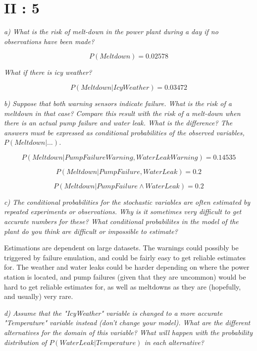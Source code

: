 \section{II : 5}
\begin{framed}\em a) What is the risk of melt-down in the power plant during a day if no observations have been made? \em\end{framed}

$$P(Meltdown) = 0.02578$$

\begin{framed}\em What if there is icy weather?\em\end{framed}

$$P(Meltdown|IcyWeather) = 0.03472$$

\begin{framed}\em b) Suppose that both warning sensors indicate failure. What is the risk of a meltdown in that case? Compare this result with the risk of a melt-down when there is an actual pump failure and water leak. What is the difference? The answers must be expressed as conditional probabilities of the observed variables, $P(Meltdown|...)$.\em\end{framed}

$$P(Meltdown|PumpFailureWarning,WaterLeakWarning) = 0.14535$$

$$P(Meltdown|PumpFailure,WaterLeak) = 0.2$$

$$P(Meltdown|PumpFailure \land WaterLeak) = 0.2$$

\begin{framed}\em c) The conditional probabilities for the stochastic variables are often estimated by repeated experiments or observations. Why is it sometimes very difficult to get accurate numbers for these? What conditional probabilites in the model of the plant do you think are difficult or impossible to estimate?\em\end{framed}

Estimations are dependent on large datasets. The warnings could possibly be triggered by failure emulation, and could be fairly easy to get reliable estimates for. The weather and water leaks could be harder depending on where the power station is located, and pump failures (given that they are uncommon) would be hard to get reliable estimates for, as well as meltdowns as they are (hopefully, and usually) very rare.

\begin{framed}\em d) Assume that the "IcyWeather" variable is changed to a more accurate "Temperature" variable instead (don't change your model). What are the different alternatives for the domain of this variable? What will happen with the probability distribution of $P(WaterLeak|Temperature)$ in each alternative? \em\end{framed}

